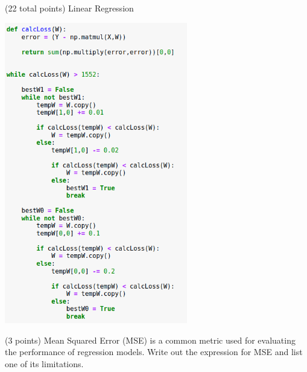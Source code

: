 \documentclass[12pt]{article}
\begin{document}
\begin{question}{(22 total points) Linear Regression}
\begin{subquestion}
\begin{answerbox}{40em}
\includegraphics [width=0.6\textwidth]{images/q1d-code.png}
\end{answerbox}



\end{subquestion}



%
%
\begin{subquestion}{(3 points) Mean Squared Error (MSE) is a common metric used for evaluating the performance of regression models. 
Write out the expression for MSE and list one of its limitations. \\
}



\end{subquestion}
\end{question}
\end{document}
